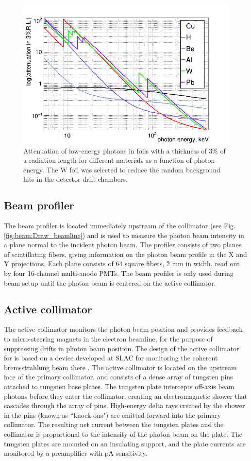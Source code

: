 \begin{figure}[tbp]
\begin{center}
\includegraphics[width=0.5\linewidth]{figures/Attenuation.png}
\caption{Attenuation of low-energy photons in foils with a thickness of  $3\%$ of a radiation length for different materials as a function of photon energy. The W foil was selected to reduce the random background hits in the detector drift chambers.
\label{fig:attenuation}  }
\end{center}
\end{figure}


\subsection{Beam profiler}
The beam profiler is located immediately upstream of the collimator (see Fig.\,\ref{fig:beam:Draw_beamline}) and is
used to measure the photon beam intensity in a plane normal to the incident
photon beam. The profiler consists of two planes
of scintillating fibers, giving information on the photon beam profile
in the X and Y projections. Each plane consists of 64 square fibers,
2 mm in width, read out by four 16-channel multi-anode PMTs. The beam profiler
is only used during beam setup until the photon beam is centered on the active collimator.

\subsection{Active collimator \label{sec:coll}}
The active collimator monitors the photon beam position and provides
feedback to micro-steering magnets in the electron beamline, for the
purpose of suppressing drifts in photon beam position. 
The
design of the active collimator for \GX{} is based on a device 
developed at SLAC for monitoring
the coherent bremsstrahlung beam there \cite{Miller:1973yi}.
The \GX{} active collimator is located on
the upstream face of the primary collimator, and consists of a dense
array of tungsten pins attached to tungsten base plates. The tungsten
plate intercepts off-axis beam photons before they enter the collimator,
creating an electromagnetic shower that cascades through the array
of pins. High-energy delta rays created by the
shower in the pins (known as ``knock-ons") 
are emitted forward into the primary collimator. The resulting net current between the tungsten plates and the collimator is proportional to the intensity of the photon beam on the plate.
The tungsten plates are mounted on an insulating support, and the plate
currents are monitored by a preamplifier with pA sensitivity. 

